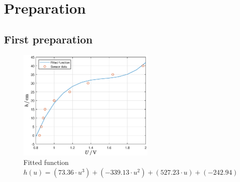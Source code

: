 \section{Preparation} \label{appendix:preparation}

\subsection{First preparation} \label{appendix:firstpreparation}
\FloatBarrier
\begin{figure}[ht]
    \begin{center}
    \includegraphics[angle=0,width=0.6\textwidth]{figure/fittedFunction.eps}
    \end{center}
    \caption[Fitted function for first lab preparation]
    {Fitted function $h(u) = (73.36 \cdot u^3) + (-339.13 \cdot u^2) + (527.23 \cdot u) + (-242.94)$}
    \label{fig:fittedFunction}
\end{figure}
\FloatBarrier

